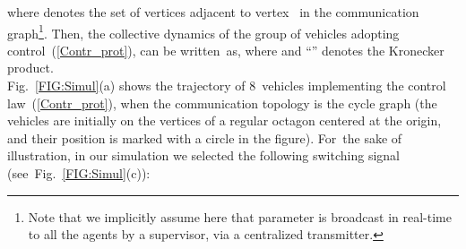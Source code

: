 \documentclass[letterpaper,9pt,twocolumn]{autart}
\begin{document}
where  denotes the set of vertices adjacent to vertex~ in the communication graph\footnote{Note that we implicitly assume here that parameter 
is broadcast in real-time to all the agents by a supervisor, via a centralized transmitter.}. Then, the collective dynamics of the group of vehicles adopting control~(\ref{Contr_prot}),
can be written~as, 
where 
and ``'' denotes the Kronecker product.\\
Fig.~\ref{FIG:Simul}(a) shows the trajectory of 8~vehicles
implementing the control law~(\ref{Contr_prot}), when the communication topology is the cycle graph 
(the vehicles are initially on the vertices of a regular octagon
centered at the origin, and their position is marked with a circle in the figure).
For~the sake of illustration, in our simulation 
we selected the following switching signal
(see~Fig.~\ref{FIG:Simul}(c)): \vspace{-0.1cm}
\end{document}
